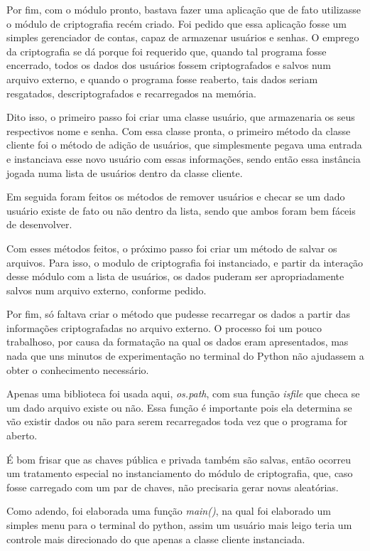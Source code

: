 \documentclass[12pt,A4]{report}
\begin{document}
Por fim, com o módulo pronto, bastava fazer uma aplicação que de fato utilizasse o módulo de criptografia recém criado. Foi pedido que essa aplicação fosse um simples gerenciador de contas, capaz de armazenar usuários e senhas. O emprego da criptografia se dá porque foi requerido que, quando tal programa fosse encerrado, todos os dados dos usuários fossem criptografados e salvos num arquivo externo, e quando o programa fosse reaberto, tais dados seriam resgatados, descriptografados e recarregados na memória.

Dito isso, o primeiro passo foi criar uma classe usuário, que armazenaria os seus respectivos nome e senha. Com essa classe pronta, o primeiro método da classe cliente foi o método de adição de usuários, que simplesmente pegava uma entrada e instanciava esse novo usuário com essas informações, sendo então essa instância jogada numa lista de usuários dentro da classe cliente.

Em seguida foram feitos os métodos de remover usuários e checar se um dado usuário existe de fato ou não dentro da lista, sendo que ambos foram bem fáceis de desenvolver.

Com esses métodos feitos, o próximo passo foi criar um método de salvar os arquivos. Para isso, o modulo de criptografia foi instanciado, e partir da interação desse módulo com a lista de usuários, os dados puderam ser apropriadamente salvos num arquivo externo, conforme pedido.

Por fim, só faltava criar o método que pudesse recarregar os dados a partir das informações criptografadas no arquivo externo. O processo foi um pouco trabalhoso, por causa da formatação na qual os dados eram apresentados, mas nada que uns minutos de experimentação no terminal do Python não ajudassem a obter o conhecimento necessário.

Apenas uma biblioteca foi usada aqui, \textit{os.path}, com sua função \textit{isfile} que checa se um dado arquivo existe ou não. Essa função é importante pois ela determina se vão existir dados ou não para serem recarregados toda vez que o programa for aberto. 

É bom frisar que as chaves pública e privada também são salvas, então ocorreu um tratamento especial no instanciamento do módulo de criptografia, que, caso fosse carregado com um par de chaves, não precisaria gerar novas aleatórias.

Como adendo, foi elaborada uma função \textit{main()}, na qual foi elaborado um simples menu para o terminal do python, assim um usuário mais leigo teria um controle mais direcionado do que apenas a classe cliente instanciada.
\end{document}
